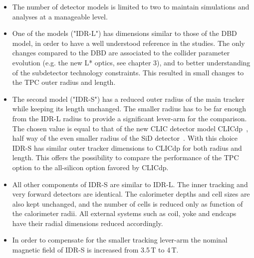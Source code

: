 \begin{itemize}
    
\item The number of detector models is limited to two to maintain simulations and analyses at a manageable level.

\item One of the models ("IDR-L") has dimensions similar to those of the DBD model, in order to have a well understood reference in the studies. The only changes compared to the DBD are associated to the collider parameter evolution (e.g. the new L* optics, see chapter 3), and to better understanding of the subdetector technology constraints. This resulted in small changes to the TPC outer radius and length. 

\item The second model ("IDR-S") has a reduced outer radius of the main tracker while keeping its length unchanged. The smaller radius has to be far enough from the IDR-L radius to provide a significant lever-arm for the comparison. The chosen value is equal to that of the new CLIC detector model CLICdp~\cite{Arominski:2018uuz}, half way of the even smaller radius of the SiD detector~\cite{ild:bib:ilddbd}. With this choice IDR-S has similar outer tracker dimensions to CLICdp for both radius and length. This offers the possibility to compare the performance of the TPC option to the all-silicon option favored by CLICdp. 

\item All other components of IDR-S are similar to IDR-L. The inner tracking and very forward detectors are identical. The calorimeter depths and cell sizes are also kept unchanged, and the number of cells is reduced only as function of the calorimeter radii. All external systems such as coil, yoke and endcaps have their radial dimensions reduced accordingly.

\item In order to compensate for the smaller tracking lever-arm the nominal magnetic field of IDR-S is increased from 3.5\,T to 4\,T.

\end{itemize}

